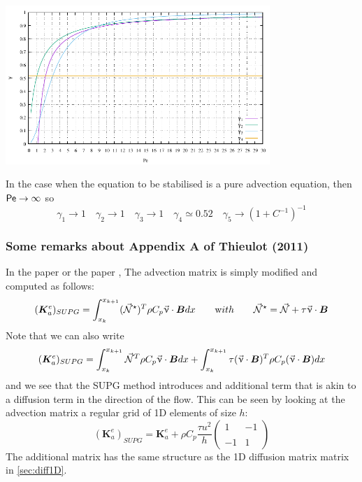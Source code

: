 \begin{center}
\includegraphics[width=10cm]{images/supg/gamma} 
\end{center}

In the case when the equation to be stabilised is a pure advection equation, 
then ${\mathsf{Pe}}\rightarrow \infty$ so 
\[
\gamma_1 \rightarrow 1  \quad
\gamma_2 \rightarrow 1 \quad
\gamma_3 \rightarrow 1 \quad
\gamma_4 \simeq 0.52 \quad
\gamma_5 \rightarrow (1+C^{-1})^{-1} 
\]


\subsubsection{Some remarks about Appendix A of Thieulot (2011) \cite{thie11}}
\label{ss:appAthie11}

In the \douar paper \cite{brtf08} or the \fantom paper \cite{thie11},
The advection matrix is simply modified and computed as follows:
\[
({\bm K}_a^e)_{SUPG}
=
\int_{x_k}^{x_{k+1}}   ({\vec {{\mathcal{N}}}}^\star)^T \rho C_p \vec\upnu \cdot {\bm B} dx  
\quad\quad
{\text with}
\quad\quad
{\vec {{\mathcal{N}}}}^\star= {\vec {{\mathcal{N}}}} + \tau \vec \upnu \cdot {\bm B}
\]
Note that we can also write 
\[
({\bm K}_a^e)_{SUPG}
=
\int_{x_k}^{x_{k+1}}   {\vec {{\mathcal{N}}}}^T \rho C_p \vec\upnu \cdot {\bm B} dx  
+
\int_{x_k}^{x_{k+1}}  \tau (\vec \upnu \cdot {\bm B})^T   \rho C_p (\vec\upnu \cdot {\bm B}) dx  
\]
and we see that the SUPG method introduces and additional term that is akin to 
a diffusion term in the direction of the flow.
This can be seen by looking at the advection matrix a regular grid of 1D 
elements of size $h$:
\[
({\bm K}_a^e)_{SUPG}=
{\bm K}_a^e
+
\rho C_p
\frac{\tau u^2}{h}
\left(
\begin{array}{cc}
1 & -1 \\ \\
-1 & 1
\end{array}
\right)
\]
The additional matrix has the same structure as the 1D diffusion matrix matrix in \ref{sec:diff1D}.

